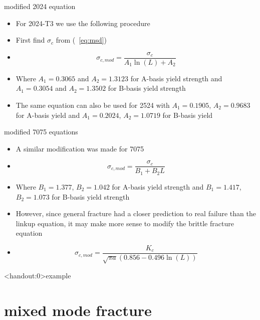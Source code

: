 \documentclass[10pt]{beamer}
\begin{document}
\begin{frame}{modified 2024 equation}
	\begin{itemize}[<+->]
		\item For 2024-T3 we use the following procedure
		\item First find $\sigma_c$ from (~\ref{eq:msd})
		\item[]
		\begin{equation}
		\sigma_{c,mod} = \frac{\sigma_c}{A_1 \ln (L) + A_2}
		\end{equation}
		\item Where $A_1 = 0.3065$ and $A_2 = 1.3123$ for A-basis yield strength and $A_1 = 0.3054$ and $A_2 = 1.3502$ for B-basis yield strength
		\item The same equation can also be used for 2524 with $A_1 = 0.1905$, $A_2 = 0.9683$ for A-basis yield and $A_1 = 0.2024$, $A_2 = 1.0719$ for B-basis yield
	\end{itemize}
\end{frame}

\begin{frame}{modified 7075 equations}
	\begin{itemize}[<+->]
		\item A similar modification was made for 7075
		\item[] \begin{equation}
		\sigma_{c,mod} = \frac{\sigma_c}{B_1 + B_2 L}
		\end{equation}
		\item Where $B_1 = 1.377$, $B_2 = 1.042$ for A-basis yield strength and $B_1 = 1.417$, $B_2 = 1.073$ for B-basis yield strength
		\item However, since general fracture had a closer prediction to real failure than the linkup equation, it may make more sense to modify the brittle fracture equation
		\item[]
		\begin{equation}
		\sigma_{c,mod} = \frac{K_c}{\sqrt{\pi a} (0.856 - 0.496 \ln(L))}
		\end{equation}
	\end{itemize}
\end{frame}

\begin{frame}<handout:0>{example}
\end{frame}

\section{mixed mode fracture}
\end{document}
